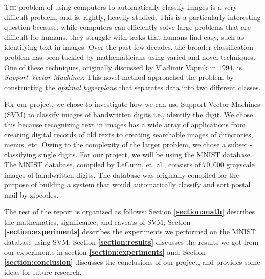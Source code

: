 
\lettrine[nindent=0em,lines=2]{T}{he} problem of using computers to automatically classify images is a very difficult problem, and is, rightly, heavily studied. This is a particularly interesting question because, while computers can efficiently solve large problems that are difficult for humans, they struggle with tasks that humans find easy, such as identifying text in images. Over the past few decades, the broader classification problem has been tackled by mathematicians using varied and novel techniques. One of these techniques, originally discussed by Vladimir Vapnik in $1994$, is \textit{Support Vector Machines}\cite{statistical-learning}. This novel method approached the problem by constructing the \textit{optimal hyperplane} that separates data into two different classes.

For our project, we chose to investigate how we can use Support Vector Machines (SVM) to classify images of handwritten digits i.e., identify the digit. We chose this because recognizing text in images has a wide array of applications from creating digital records of old texts to creating searchable images of directories, menus, etc. Owing to the complexity of the larger problem, we chose a subset - classifying single digits. For our project, we will be using the MNIST database\cite{mnist}. The MNIST database, compiled by LeCunn, et. al., consists of $70,000$ grayscale images of handwritten digits. The database was originally compiled for the purpose of building a system that would automatically classify and sort postal mail by zipcodes.

The rest of the report is organized as follows: Section \textbf{\ref{section:math}} describes the mathematics, significance, and caveats of SVM; Section \textbf{\ref{section:experiments}} describes the experiments we performed on the MNIST database using SVM; Section \textbf{\ref{section:results}} discusses the results we got from our experiments in section \textbf{\ref{section:experiments}} and; Section \textbf{\ref{section:conclusion}} discusses the conclusions of our project, and provides some ideas for future research.